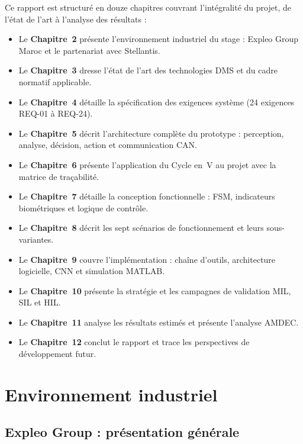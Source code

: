 \documentclass[12pt,a4paper]{report}
\begin{document}
Ce rapport est structur\'e en douze chapitres couvrant l'int\'egralit\'e du projet, de l'\'etat de l'art \`a l'analyse des r\'esultats :

\begin{itemize}
  \item Le \textbf{Chapitre~2} pr\'esente l'environnement industriel du stage : Expleo Group Maroc et le partenariat avec Stellantis.
  \item Le \textbf{Chapitre~3} dresse l'\'etat de l'art des technologies DMS et du cadre normatif applicable.
  \item Le \textbf{Chapitre~4} d\'etaille la sp\'ecification des exigences syst\`eme (24 exigences REQ-01 \`a REQ-24).
  \item Le \textbf{Chapitre~5} d\'ecrit l'architecture compl\`ete du prototype : perception, analyse, d\'ecision, action et communication CAN.
  \item Le \textbf{Chapitre~6} pr\'esente l'application du Cycle en~V au projet avec la matrice de tra\c{c}abilit\'e.
  \item Le \textbf{Chapitre~7} d\'etaille la conception fonctionnelle : FSM, indicateurs biom\'etriques et logique de contr\^ole.
  \item Le \textbf{Chapitre~8} d\'ecrit les sept sc\'enarios de fonctionnement et leurs sous-variantes.
  \item Le \textbf{Chapitre~9} couvre l'impl\'ementation : cha\^ine d'outils, architecture logicielle, CNN et simulation MATLAB.
  \item Le \textbf{Chapitre~10} pr\'esente la strat\'egie et les campagnes de validation MIL, SIL et HIL.
  \item Le \textbf{Chapitre~11} analyse les r\'esultats estim\'es et pr\'esente l'analyse AMDEC.
  \item Le \textbf{Chapitre~12} conclut le rapport et trace les perspectives de d\'eveloppement futur.
\end{itemize}

\clearpage

\chapter{Environnement industriel}

\section{Expleo Group : pr\'esentation g\'en\'erale}
\end{document}
